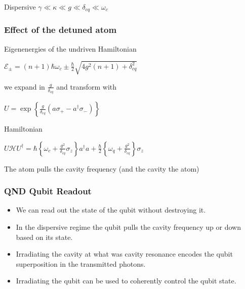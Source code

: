 \documentclass{beamer}
\begin{document}
\begin{frame}

    

\end{frame}
\begin{frame}

    \begin{block}{Dispersive}
        $\gamma \ll \kappa \ll g \ll \delta_{cq} \ll \omega_c$
    \end{block}

\end{frame}
\begin{frame}

    \frametitle{Effect of the detuned atom}

    \begin{block}{Eigenenergies of the undriven Hamiltonian}

        $\mathscr{E}_{\pm} = (n+1) \hbar \omega_c \pm 
            \frac{\hbar}{2} \sqrt{4g^2 ( n+1 ) + \delta_{cq}^2}$

    we expand in $\frac{g}{\delta_{cq}}$ and transform with 

        $U = \exp \left \{\frac{g}{\delta_{cq}} 
            ( a \sigma_+ - a ^ \dagger \sigma_- ) \right \}$

    \end{block}

    \begin{block}{Hamiltonian} 

    $ U\mathscr{H}U ^ \dagger = \hbar 
    \left\{ \omega_c + \frac{g^2}{\delta_{cq}} \sigma_z \right\}
    a ^ \dagger a + 

    \frac{\hbar}{2} \left\{ \omega_q + \frac{g^2}{\delta_{cq}} \right\}
    \sigma_z $
    
    The atom pulls the cavity frequency (and the cavity the atom)

    \end{block}

\end{frame}
\begin{frame}

    \frametitle{QND Qubit Readout}

    \begin{itemize}

        \item We can read out the state of the qubit 
                without destroying it. 
        \item In the dispersive regime the qubit pulls the 
                cavity frequency up or down based on its state.
        \item Irradiating the cavity at what was cavity 
                resonance encodes the qubit superposition 
                in the transmitted photons. 
        \item Irradiating the qubit can be used to coherently 
                control the qubit state. 

    \end{itemize}

\end{frame}
\end{document}
